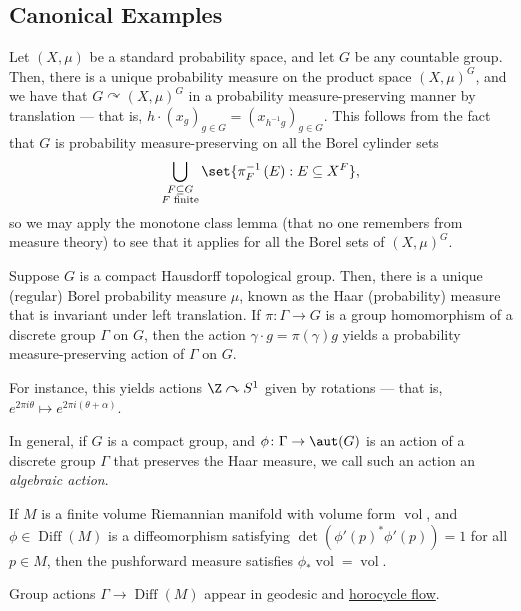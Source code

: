 \documentclass[10pt]{mypackage}
\begin{document}
\subsection{Canonical Examples}%
\begin{example}
  Let $\left( X,\mu \right)$ be a standard probability space, and let $G$ be any countable group. Then, there is a unique probability measure on the product space $\left( X,\mu \right)^{G}$, and we have that $G\curvearrowright \left( X,\mu \right)^{G}$ in a probability measure-preserving manner by translation --- that is, $h\cdot \left( x_g \right)_{g\in G} = \left( x_{h^{-1}g} \right)_{g\in G} $. This follows from the fact that $G$ is probability measure-preserving on all the Borel cylinder sets
  \begin{align*}
    \bigcup_{\substack{F\subseteq G\\F\text{ finite}}} \set{\pi_{F}^{-1}\left( E \right) : E\subseteq X^{F}},
  \end{align*}
  so we may apply the monotone class lemma (that no one remembers from measure theory) to see that it applies for all the Borel sets of $\left( X,\mu \right)^{G}$.
\end{example}
\begin{example}
  Suppose $G$ is a compact Hausdorff topological group. Then, there is a unique (regular) Borel probability measure $\mu$, known as the Haar (probability) measure that is invariant under left translation. If $\pi\colon \Gamma\rightarrow G$ is a group homomorphism of a discrete group $\Gamma$ on $G$, then the action $\gamma\cdot g = \pi(\gamma)g$ yields a probability measure-preserving action of $\Gamma$ on $G$.

  For instance, this yields actions $\Z\curvearrowright S^1$ given by rotations --- that is, $e^{2\pi i \theta}\mapsto e^{2\pi i \left( \theta + \alpha \right)}$.

  In general, if $G$ is a compact group, and $\phi\colon \Gamma\rightarrow \aut(G)$ is an action of a discrete group $\Gamma$ that preserves the Haar measure, we call such an action an \textit{algebraic action}.
\end{example}
\begin{example}
  If $M$ is a finite volume Riemannian manifold with volume form $\operatorname{vol}$, and $\phi\in \operatorname{Diff}\left( M \right)$ is a diffeomorphism satisfying $\det\left( \phi'(p)^{\ast}\phi'(p) \right) = 1$ for all $p\in M$, then the pushforward measure satisfies $\phi_{\ast}\operatorname{vol} = \operatorname{vol}$.

  Group actions $\Gamma\to \operatorname{Diff}\left( M \right)$ appear in geodesic and \href{https://en.wikipedia.org/wiki/Horocycle}{horocycle flow}.
\end{example}
\end{document}
